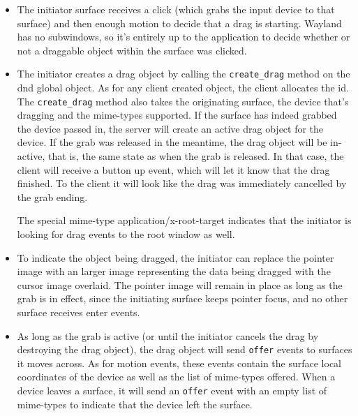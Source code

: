 \documentclass{article}
\begin{document}
\begin{itemize}
\item The initiator surface receives a click (which grabs the input
  device to that surface) and then enough motion to decide that a drag
  is starting.  Wayland has no subwindows, so it's entirely up to the
  application to decide whether or not a draggable object within the
  surface was clicked.

\item The initiator creates a drag object by calling the
  \texttt{create\_drag} method on the dnd global object.  As for any
  client created object, the client allocates the id.  The
  \texttt{create\_drag} method also takes the originating surface, the
  device that's dragging and the mime-types supported.  If the surface
  has indeed grabbed the device passed in, the server will create an
  active drag object for the device.  If the grab was released in the
  meantime, the drag object will be in-active, that is, the same state
  as when the grab is released.  In that case, the client will receive
  a button up event, which will let it know that the drag finished.
  To the client it will look like the drag was immediately cancelled
  by the grab ending.

  The special mime-type application/x-root-target indicates that the
  initiator is looking for drag events to the root window as well.

\item To indicate the object being dragged, the initiator can replace
  the pointer image with an larger image representing the data being
  dragged with the cursor image overlaid.  The pointer image will
  remain in place as long as the grab is in effect, since the
  initiating surface keeps pointer focus, and no other surface
  receives enter events.

\item As long as the grab is active (or until the initiator cancels
  the drag by destroying the drag object), the drag object will send
  \texttt{offer} events to surfaces it moves across. As for motion
  events, these events contain the surface local coordinates of the
  device as well as the list of mime-types offered.  When a device
  leaves a surface, it will send an \texttt{offer} event with an empty
  list of mime-types to indicate that the device left the surface.


\end{itemize}
\end{document}
